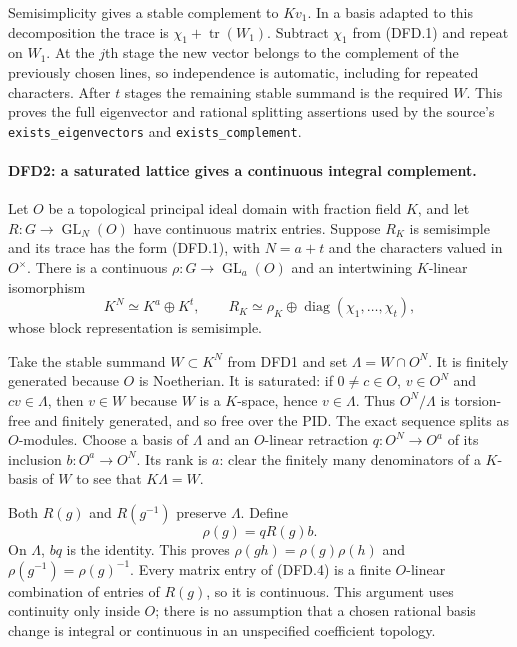 Semisimplicity gives a stable complement to $Kv_1$. In a basis
adapted to this decomposition the trace is
$\chi_1+\operatorname{tr}(W_1)$. Subtract $\chi_1$ from (DFD.1)
and repeat on $W_1$. At the $j$th stage the new vector belongs to
the complement of the previously chosen lines, so independence is
automatic, including for repeated characters. After $t$ stages
the remaining stable summand is the required $W$. This proves the
full eigenvector and rational splitting assertions used by the
source's \texttt{exists\_\allowbreak eigenvectors} and \texttt{exists\_\allowbreak complement}.

\paragraph{DFD2: a saturated lattice gives a continuous integral complement.}
\label{claim:DFD2}
Let $O$ be a topological principal ideal domain with fraction field
$K$, and let $R:G\to\operatorname{GL}_N(O)$ have continuous matrix
entries. Suppose $R_K$ is semisimple and its trace has the form
(DFD.1), with $N=a+t$ and the characters valued in $O^\times$.
There is a continuous $\rho:G\to\operatorname{GL}_a(O)$ and an
intertwining $K$-linear isomorphism
\[
 K^N\simeq K^a\oplus K^t,
 \qquad R_K\simeq\rho_K\oplus
      \operatorname{diag}(\chi_1,\ldots,\chi_t),           \tag{DFD.3}
\]
whose block representation is semisimple.

Take the stable summand $W\subset K^N$ from DFD1 and set
$\Lambda=W\cap O^N$. It is finitely generated because $O$ is
Noetherian. It is saturated: if $0\ne c\in O$, $v\in O^N$ and
$cv\in\Lambda$, then $v\in W$ because $W$ is a $K$-space, hence
$v\in\Lambda$. Thus $O^N/\Lambda$ is torsion-free and finitely
generated, and so free over the PID. The exact sequence splits
as $O$-modules. Choose a basis of $\Lambda$ and an $O$-linear
retraction $q:O^N\to O^a$ of its inclusion
$b:O^a\to O^N$. Its rank is $a$: clear the finitely many
denominators of a $K$-basis of $W$ to see that $K\Lambda=W$.

Both $R(g)$ and $R(g^{-1})$ preserve $\Lambda$. Define
\[
             \rho(g)=qR(g)b.                             \tag{DFD.4}
\]
On $\Lambda$, $bq$ is the identity. This proves
$\rho(gh)=\rho(g)\rho(h)$ and
$\rho(g^{-1})=\rho(g)^{-1}$. Every matrix entry of (DFD.4) is a
finite $O$-linear combination of entries of $R(g)$, so it is
continuous. This argument uses continuity only inside $O$;
there is no assumption that a chosen rational basis change is
integral or continuous in an unspecified coefficient topology.

